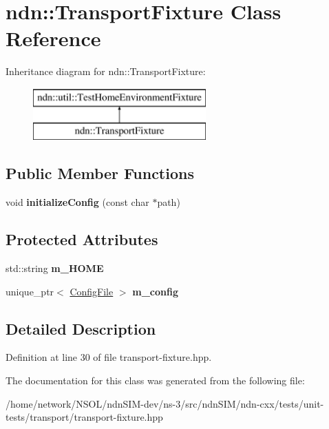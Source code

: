 \hypertarget{classndn_1_1TransportFixture}{}\section{ndn\+:\+:Transport\+Fixture Class Reference}
\label{classndn_1_1TransportFixture}
Inheritance diagram for ndn\+:\+:Transport\+Fixture\+:\begin{figure}[H]
\begin{center}
\leavevmode
\includegraphics[height=2.000000cm]{classndn_1_1TransportFixture}
\end{center}
\end{figure}
\subsection*{Public Member Functions}
\begin{DoxyCompactItemize}
\item 
void {\bfseries initialize\+Config} (const char $\ast$path)\hypertarget{classndn_1_1TransportFixture_a3f29d4fe6f497ab2a5dfe353bc5eb6b8}{}\label{classndn_1_1TransportFixture_a3f29d4fe6f497ab2a5dfe353bc5eb6b8}

\end{DoxyCompactItemize}
\subsection*{Protected Attributes}
\begin{DoxyCompactItemize}
\item 
std\+::string {\bfseries m\+\_\+\+H\+O\+ME}\hypertarget{classndn_1_1TransportFixture_a5c6542562451370bc799ef139507cfa9}{}\label{classndn_1_1TransportFixture_a5c6542562451370bc799ef139507cfa9}

\item 
unique\+\_\+ptr$<$ \hyperlink{classndn_1_1ConfigFile}{Config\+File} $>$ {\bfseries m\+\_\+config}\hypertarget{classndn_1_1TransportFixture_a00da1d24a9886386ca9bbb1f153f7805}{}\label{classndn_1_1TransportFixture_a00da1d24a9886386ca9bbb1f153f7805}

\end{DoxyCompactItemize}


\subsection{Detailed Description}


Definition at line 30 of file transport-\/fixture.\+hpp.



The documentation for this class was generated from the following file\+:\begin{DoxyCompactItemize}
\item 
/home/network/\+N\+S\+O\+L/ndn\+S\+I\+M-\/dev/ns-\/3/src/ndn\+S\+I\+M/ndn-\/cxx/tests/unit-\/tests/transport/transport-\/fixture.\+hpp\end{DoxyCompactItemize}
